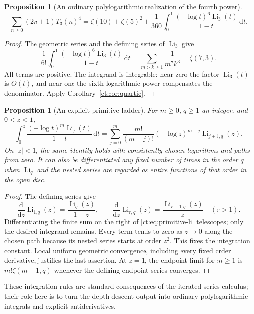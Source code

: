\documentclass[11pt]{article}
\numberwithin{equation}{section}
\newtheorem{proposition}[theorem]{Proposition}
\theoremstyle{definition}\newtheorem{definition}[theorem]{Definition}
\theoremstyle{remark}\newtheorem{remark}[theorem]{Remark}
\DeclareMathOperator{\Li}{Li}
\newcommand{\dd}{\,\mathrm d}
\begin{document}
\begin{proposition}[An ordinary polylogarithmic realization of the fourth power]
\label{ct:prop:polylog-quartic}
\begin{equation}\label{ct:eq:polylog-quartic}
 \sum_{n\ge0}(2n+1)T_3(n)^4
 =\zeta(10)+\zeta(5)^2+
     \frac1{360}\int_0^1\frac{(-\log t)^6\Li_3(t)}{1-t}\dd t.
\end{equation}
\end{proposition}
\begin{proof}
The geometric series and the defining series of $\Li_3$ give
\[
 \frac1{6!}\int_0^1\frac{(-\log t)^6\Li_3(t)}{1-t}\dd t
 =\sum_{m>k\ge1}\frac1{m^7k^3}=\zeta(7,3).
\]
All terms are positive. The integrand is integrable: near zero the factor
$\Li_3(t)$ is $O(t)$, and near one the sixth logarithmic power compensates
the denominator. Apply Corollary~\ref{ct:cor:quartic}.
\end{proof}

\begin{proposition}[An explicit primitive ladder]\label{ct:prop:primitive-li}
For $m\ge0$, $q\ge1$ an integer, and $0<z<1$,
\begin{equation}\label{ct:eq:primitive-li}
 \int_0^z\frac{(-\log t)^m\Li_q(t)}{1-t}\dd t
 =\sum_{j=0}^m\frac{m!}{(m-j)!}(-\log z)^{m-j}\Li_{j+1,q}(z).
\end{equation}
On $|z|<1$, the same identity holds with consistently chosen logarithms
and paths from zero. It can also be differentiated any fixed number of
times in the order $q$ when $\Li_q$ and the nested series are regarded as
entire functions of that order in the open disc.
\end{proposition}
\begin{proof}
The defining series give
\[
 \frac{\mathrm d}{\mathrm dz}\Li_{1,q}(z)=\frac{\Li_q(z)}{1-z},\qquad
 \frac{\mathrm d}{\mathrm dz}\Li_{r,q}(z)=\frac{\Li_{r-1,q}(z)}z\quad(r>1).
\]
Differentiating the finite sum on the right of
\eqref{ct:eq:primitive-li} telescopes; only the desired integrand remains.
Every term tends to zero as $z\to0$ along the chosen path because its nested
series starts at order $z^2$. This fixes the integration constant.
Local uniform geometric convergence, including every fixed order derivative,
justifies the last assertion. At $z=1$, the endpoint limit for $m\ge1$
is $m!\zeta(m+1,q)$ whenever the defining endpoint series converges.
\end{proof}
These integration rules are standard consequences of the iterated-series
calculus; their role here is to turn the depth-descent output into ordinary
polylogarithmic integrals and explicit antiderivatives.
\end{document}
